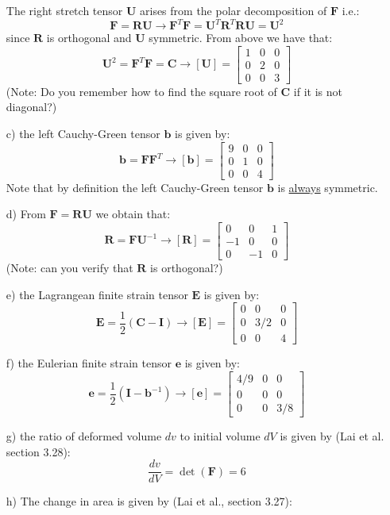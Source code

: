 \documentclass{article}
\newcommand{\ee}{\end{equation}}
\newcommand{\be}{\begin{equation}}
\newcommand{\bs}{\boldsymbol}
\begin{document}
\begin{enumerate}
The right stretch tensor $\bs{U}$ arises from the polar decomposition of $\bs{F}$ i.e.:
\be
\bs{F}=\bs{R U} \to \bs{F}^T\bs{F}=\bs{U}^T \bs{R}^T \bs{R U} =\bs{U}^2
\ee
since $\bs{R}$ is orthogonal and $\bs{U}$ symmetric. From above we have that:
\be
\bs{U}^2=\bs{F}^T\bs{F}=\bs{C} \to [\bs{U}]=\left[\begin{array}{lll} 1 & 0 & 0 \\0 & 2 & 0 \\0 & 0 & 3 \end{array}
\right]
\ee
(Note: Do you remember how to find the square root of $\bs{C}$ if it is not diagonal?)
\item[c)] the left Cauchy-Green tensor $\bs{b}$ is given by:
\be
\bs{b}=\bs{F}\bs{F}^T \to [\bs{b}]=\left[ \begin{array}{lll} 9 & 0 & 0 \\0 & 1 & 0 \\0 & 0 & 4 \end{array} \right]
\ee
Note that by definition the left Cauchy-Green tensor $\bs{b}$ is \underline{always} symmetric.
\item[d)] From $\bs{F}=\bs{R U}$ we obtain that:
\be
\bs{R}=\bs{F}\bs{U}^{-1} \to [\bs{R}]=\left[ \begin{array}{lll} 0 & 0 & 1 \\-1 & 0 & 0 \\0 & -1 & 0 \end{array} \right]
\ee
(Note: can you verify that $\bs{R}$ is orthogonal?)
\item[e)] the Lagrangean finite  strain tensor $\bs{E}$  is given by:
\be
\bs{E}=\frac{1}{2}(\bs{C} -\bs{I}) \to [\bs{E}]=\left[ \begin{array}{lll} 0 & 0 & 0 \\0 & 3/2 & 0 \\0 & 0 & 4
\end{array} \right]
\ee
\item[f)] the Eulerian finite  strain tensor $\bs{e}$ is given by:
\be
\bs{e}=\frac{1}{2}(\bs{I} -\bs{b}^{-1}) \to [\bs{e}]=\left[ \begin{array}{lll} 4/9 & 0 & 0 \\0 & 0 & 0 \\0 & 0 & 3/8
\end{array} \right]
\ee
\item[g)] the ratio of deformed volume $dv$ to initial volume $dV$ is given by (Lai et al. section 3.28):
\be
\frac{dv}{dV} = \det(\bs{F}) = 6
\ee
\item[h)] The change in area is given by (Lai et al., section 3.27):

\end{enumerate}
\end{document}
